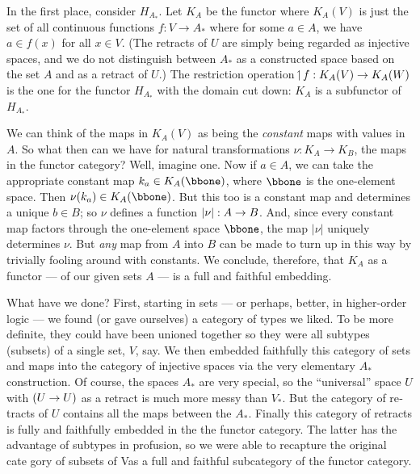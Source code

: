 In the first place, consider $H_{A_*}$.	Let $K_A$ be the functor where $K_A(V)$ is just the set of all continuous functions
$f: V\to A_*$ where for some $a \in A$, we have $a \in f(x)$ for all $x \in V$. (The retracts of $U$ are simply being regarded as injective spaces, and we do not distinguish between $A_*$ as a constructed space based on the set $A$ and as a retract of $U$.) The restric­tion operation 
$\!\upharpoonleft\! f : K_A(V)\rightarrow K_A(W)$
is the one for the functor $H_{A_*}$ with the domain cut down: $K_A$ is a subfunctor of $H_{A_*}$.

We can think of the maps in $K_A(V)$ as being the {\it constant} maps with
values in $A$. So what then can we have for natural transformations $\nu: K_A \to K_B$, the maps in the functor category? Well, imagine one. Now if $a \in A$, we can take the appropriate con­stant map $k_a \in K_A(\bbone)$, where $\bbone$ is the one-element space. Then $\nu(k_a) \in K_A(\bbone)$.
But this too is a constant map and determines a unique $b \in B$; so $\nu$ defines a function $|\nu| : A \rightarrow B$. And, since every constant map factors through the one-element space $\bbone$, the map $|\nu|$ uniquely determines $\nu$. But {\it any} map from $A$ into $B$ can
be made to turn up in this way by trivially fooling around with constants. We conclude, therefore, that $K_A$ as a functor --- of our given sets $A$ --- is a full and faithful embedding.

What have we done? First, starting in sets --- or perhaps, better, in higher-order logic --- we found (or gave ourselves) a category of types we liked. To be more definite, they could
have been unioned together so they were all subtypes (subsets) of a single set, $V$, say. We then embedded faithfully this category of sets and maps into the category of injective spaces via the very elementary $A_*$ construction. Of course, the spaces $A_*$ are very special, so the ``universal'' space $U$ with $(U\rightarrow U)$ as a retract is much more messy than $V_*$. But the category of re­tracts of $U$ contains all the maps between the $A_*$. Finally this category of retracts is fully and faithfully embedded in the the functor category. The latter has the advantage of subtypes in profusion, so we were able to recapture the original cate­ gory of subsets of Vas a full and faithful subcategory of the functor category.

